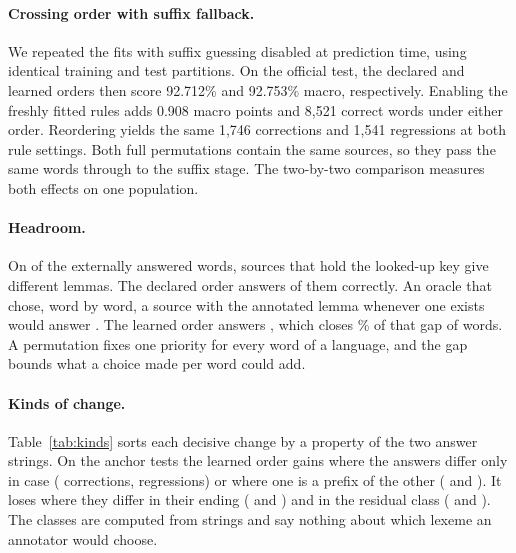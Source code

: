 \documentclass[11pt]{article}
\begin{document}
\paragraph{Crossing order with suffix fallback.}
We repeated the fits with suffix guessing disabled at prediction time,
using identical training and test partitions. On the official test, the
declared and learned orders then score 92.712\% and 92.753\% macro,
respectively. Enabling the freshly fitted rules adds 0.908 macro points
and 8,521 correct words under either order. Reordering yields the same
1,746 corrections and 1,541 regressions at both rule settings. Both full
permutations contain the same sources, so they pass the same words through
to the suffix stage. The two-by-two comparison measures both effects on
one population.

\paragraph{Headroom.}
On \anDisputed{} of the externally answered words, sources that hold the
looked-up key give different lemmas. The declared order answers
\anDisputedDeclared{} of them correctly. An oracle that chose, word by word,
a source with the annotated lemma whenever one exists would answer
\anOracle. The learned order answers \anDisputedLearned, which closes
\anRealized\% of that gap of \anGap{} words. A permutation fixes one
priority for every word of a language, and the gap bounds what a choice
made per word could add.

\begin{table}[t]
\centering\small

\caption{Corrections / regressions of the learned order by how the two
answers differ, for official fits. Case and diacritics: equal after case
folding or after also removing combining marks. Word itself: one answer is
the word form. Nested: one answer is a prefix of the other. Different
ending: a shared prefix of at least three characters and half of the longer
answer.}
\label{tab:kinds}
\end{table}

\paragraph{Kinds of change.}
Table~\ref{tab:kinds} sorts each decisive change by a property of the two
answer strings. On the anchor tests the learned order gains where the
answers differ only in case (\anCaseCorr{} corrections, \anCaseReg{}
regressions) or where one is a prefix of the other (\anNestedCorr{} and
\anNestedReg). It loses where they differ in their ending (\anEndingCorr{}
and \anEndingReg) and in the residual class (\anOtherCorr{} and
\anOtherReg). The classes are computed from strings and say nothing about
which lexeme an annotator would choose.
\end{document}
